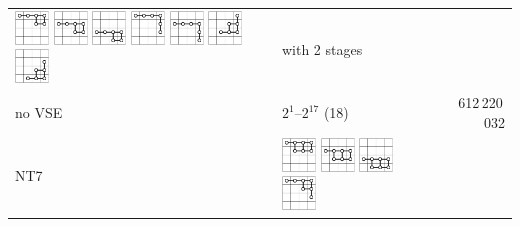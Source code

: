 \documentclass[runningheads]{llncs}
\begin{document}
\begin{tabular}{p{1.2cm}l@{~~}r}
\includegraphics[width=0.9cm]{figures/NTuple-62.pdf}
\includegraphics[width=0.9cm]{figures/NTuple-63.pdf}
\includegraphics[width=0.9cm]{figures/NTuple-64.pdf}
\includegraphics[width=0.9cm]{figures/NTuple-65.pdf}
\includegraphics[width=0.9cm]{figures/NTuple-66.pdf}
\includegraphics[width=0.9cm]{figures/NTuple-67.pdf}
\includegraphics[width=0.9cm]{figures/NTuple-68.pdf}
& with 2 stages \\
no VSE & \phantom{\rule{1pt}{9.5pt}} $2^1$--$2^{17}$ (18) & 612\,220\,032 \\\hline
\textsf{NT7}
&
\includegraphics[width=0.9cm]{figures/NTuple-70.pdf}
\includegraphics[width=0.9cm]{figures/NTuple-71.pdf}
\includegraphics[width=0.9cm]{figures/NTuple-72.pdf}
\includegraphics[width=0.9cm]{figures/NTuple-73.pdf}

\end{tabular}
\end{document}
